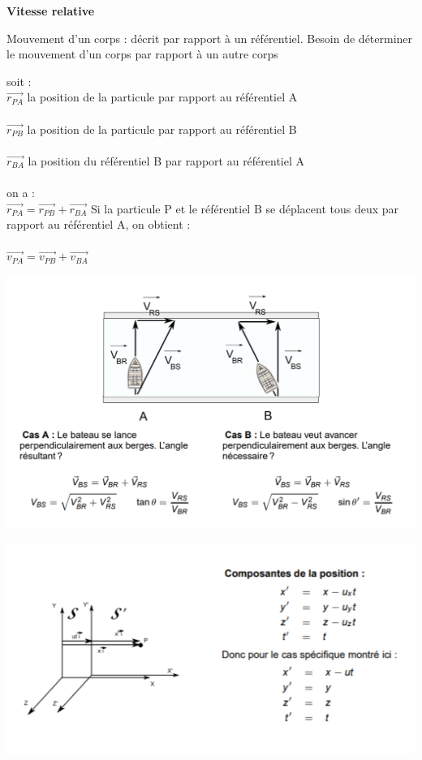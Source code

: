 \documentclass[]{article}
\begin{document}
\noindent \textbf{Vitesse relative}

Mouvement d’un corps : décrit par rapport à un référentiel. 
Besoin de déterminer le mouvement d’un corps par rapport à un autre corps

soit :\\
\indent \indent $\overrightarrow{r_{PA}}$ la position de la particule par rapport au référentiel A\\\\
\indent \indent $\overrightarrow{r_{PB}}$ la position de la particule par rapport au référentiel B\\\\
\indent \indent $\overrightarrow{r_{BA}}$ la position du référentiel B par rapport au référentiel A\\\\

on a :\\
\indent \indent $\overrightarrow{r_{PA}} = \overrightarrow{r_{PB}} + \overrightarrow{r_{BA}}$
\newpage
Si la particule P et le référentiel B se déplacent tous deux par rapport au référentiel A, on obtient :\\\\
\indent \indent $\overrightarrow{v_{PA}} = \overrightarrow{v_{PB}} + \overrightarrow{v_{BA}}$

\includegraphics[scale=0.5]{vitesse_rel}\\
\newpage

\includegraphics[scale=1]{transformation_gal}\\
\end{document}
